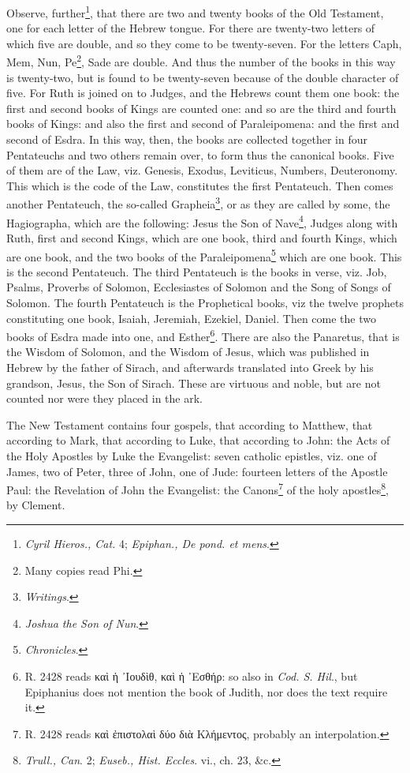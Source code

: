 Observe, further\footnote{\emph{Cyril Hieros., Cat. }4; \emph{Epiphan., De pond. et mens}.}, that there are two and twenty books of the Old Testament, one for each letter of the Hebrew tongue. For there are twenty-two letters of which five are double, and so they come to be twenty-seven. For the letters Caph, Mem, Nun, Pe\footnote{Many copies read Phi.}, Sade are double. And thus the number of the books in this way is twenty-two, but is found to be twenty-seven because of the double character of five. For Ruth is joined on to Judges, and the Hebrews count them one book: the first and second books of Kings are counted one: and so are the third and fourth books of Kings: and also the first and second of Paraleipomena: and the first and second of Esdra. In this way, then, the books are collected together in four Pentateuchs and two others remain over, to form thus the canonical books. Five of them are of the Law, viz. Genesis, Exodus, Leviticus, Numbers, Deuteronomy. This which is the code of the Law, constitutes the first Pentateuch. Then comes another Pentateuch, the so-called Grapheia\footnote{\emph{Writings}.}, or as they are called by some, the Hagiographa, which are the following: Jesus the Son of Nave\footnote{\emph{Joshua the Son of Nun}.}, Judges along with Ruth, first and second Kings, which are one book, third and fourth Kings, which are one book, and the two books of the Paraleipomena\footnote{\emph{Chronicles}.} which are one book. This is the second Pentateuch. The third Pentateuch is the books in verse, viz. Job, Psalms, Proverbs of Solomon, Ecclesiastes of Solomon and the Song of Songs of Solomon. The fourth Pentateuch is the Prophetical books, viz the twelve prophets constituting one book, Isaiah, Jeremiah, Ezekiel, Daniel. Then come the two books of Esdra made into one, and Esther\footnote{R. 2428 reads \textgreek{καὶ ἡ ᾽Ιουδὶθ, καὶ ἡ ᾽Εσθήρ}: so also in \emph{Cod. S. Hil}., but Epiphanius does not mention the book of Judith, nor does the text require it.}. There are also the Panaretus, that is the Wisdom of Solomon, and the Wisdom of Jesus, which was published in Hebrew by the father of Sirach, and afterwards translated into Greek by his grandson, Jesus, the Son of Sirach. These are virtuous and noble, but are not counted nor were they placed in the ark.

The New Testament contains four gospels, that according to Matthew, that according to Mark, that according to Luke, that according to John: the Acts of the Holy Apostles by Luke the Evangelist: seven catholic epistles, viz. one of James, two of Peter, three of John, one of Jude: fourteen letters of the Apostle Paul: the Revelation of John the Evangelist: the Canons\footnote{R. 2428 reads \textgreek{καὶ ἐπιστολαὶ δύο διὰ Κλήμεντος}, probably an interpolation.} of the holy apostles\footnote{\emph{Trull., Can}. 2; \emph{Euseb., Hist. Eccles}. vi., ch. 23, \&c.}, by Clement.

